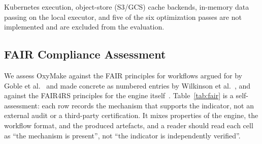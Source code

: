 \documentclass[12pt,a4paper]{article}
\begin{document}
\noindent Kubernetes execution, object-store (S3/GCS) cache backends,
in-memory data passing on the local executor, and five of the six
optimization passes are not implemented and are excluded from the
evaluation.

\subsection{FAIR Compliance Assessment}
\label{sec:fair-eval}

We assess OxyMake against the FAIR principles for workflows argued for
by Goble et al.~\cite{gobleFAIRComputationalWorkflows2020} and made
concrete as numbered entries by Wilkinson et
al.~\cite{wilkinsonApplyingFAIRPrinciples2025}, and against
the FAIR4RS principles for the engine
itself~\cite{chueHongFAIR4RSPrinciples2022}.
Table~\ref{tab:fair} is a self-assessment: each row records the mechanism
that supports the indicator, not an external audit or a third-party
certification. It mixes properties of the engine, the workflow format,
and the produced artefacts, and a reader should read each cell as ``the
mechanism is present'', not ``the indicator is independently verified''.
\end{document}
